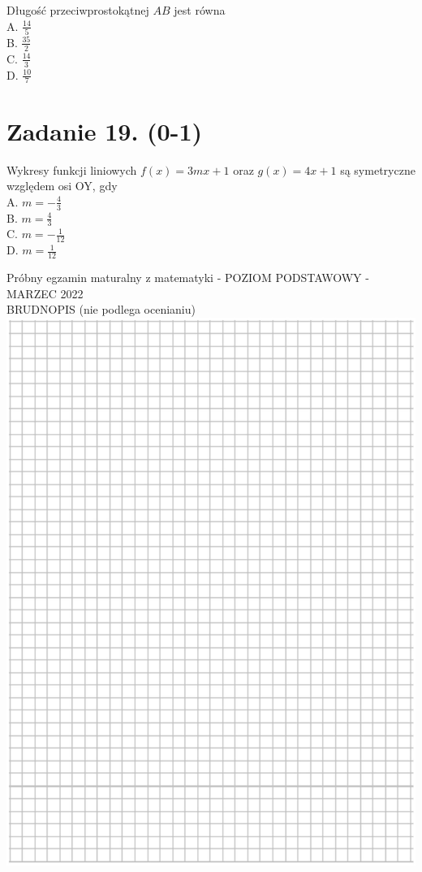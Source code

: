 \documentclass[10pt]{article}
\begin{document}
Długość przeciwprostokątnej \(A B\) jest równa\\
A. \(\frac{14}{5}\)\\
B. \(\frac{35}{2}\)\\
C. \(\frac{14}{3}\)\\
D. \(\frac{10}{7}\)

\section*{Zadanie 19. (0-1)}
Wykresy funkcji liniowych \(f(x)=3 m x+1\) oraz \(g(x)=4 x+1\) są symetryczne względem osi OY, gdy\\
A. \(m=-\frac{4}{3}\)\\
B. \(m=\frac{4}{3}\)\\
C. \(m=-\frac{1}{12}\)\\
D. \(m=\frac{1}{12}\)

Próbny egzamin maturalny z matematyki - POZIOM PODSTAWOWY - MARZEC 2022\\
BRUDNOPIS (nie podlega ocenianiu)\\
\includegraphics[max width=\textwidth, center]{2024_11_21_fd555512e32c497e8a5dg-09}
\end{document}

